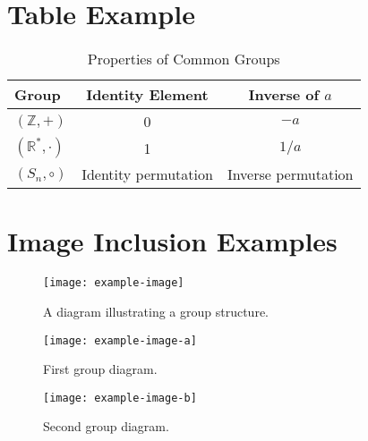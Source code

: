 \documentclass[11pt, a4paper]{article}
\theoremstyle{plain}
\theoremstyle{definition}
\begin{document}
	\section{Table Example}
	\begin{table}[h]
		\centering
		\caption{Properties of Common Groups}
		\begin{tabular}{lcc}
			\toprule
			Group & Identity Element & Inverse of $a$ \\
			\midrule
			\( (\mathbb{Z}, +) \) & 0 & $-a$ \\
			\( (\mathbb{R}^*, \cdot) \) & 1 & $1/a$ \\
			\( (S_n, \circ) \) & Identity permutation & Inverse permutation \\
			\bottomrule
		\end{tabular}
		\label{tab:group_properties}
	\end{table}
	
	\section{Image Inclusion Examples}
	\begin{figure}[h]
		\centering
		\texttt{[image: example-image]}
		\caption{A diagram illustrating a group structure.}
		\label{fig:group_diagram}
	\end{figure}
	
	\begin{figure}[h]
		\centering
		\begin{minipage}{0.45\textwidth}
			\centering
			\texttt{[image: example-image-a]}
			\caption{First group diagram.}
			\label{fig:group_diagram_a}
		\end{minipage}\hfill
		\begin{minipage}{0.45\textwidth}
			\centering
			\texttt{[image: example-image-b]}
			\caption{Second group diagram.}
			\label{fig:group_diagram_b}
		\end{minipage}
	\end{figure}
	
\end{document}
